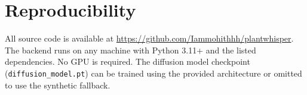 \documentclass[11pt,a4paper,twocolumn]{article}
\begin{document}
\appendix
\section{Reproducibility}

All source code is available at \url{https://github.com/Iammohithhh/plantwhisper}. The backend runs on any machine with Python 3.11+ and the listed dependencies. No GPU is required. The diffusion model checkpoint (\texttt{diffusion\_model.pt}) can be trained using the provided architecture or omitted to use the synthetic fallback.
\end{document}
